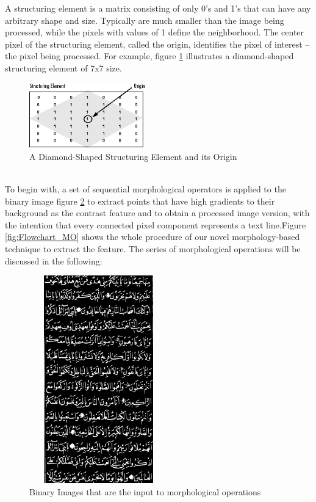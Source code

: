 \noindent
A structuring element is a matrix consisting of only 0's and 1's that can have any arbitrary shape and size. Typically are much smaller than the image being processed, while the pixels with values of 1 define the neighborhood. The center pixel of the structuring element, called the origin, identifies the pixel of interest – the pixel being processed.
\noindent
For example, figure \ref{fig:structuring-element} illustrates a diamond-shaped structuring element of 7x7 size.
\begin{figure}[!htb]
    \centering
    \includegraphics[width=5cm]{images/SE.png}
    \caption{A Diamond-Shaped Structuring Element and its Origin}
    \label{fig:structuring-element}
\end{figure} \\


To begin with, a set of sequential morphological operators is applied to the binary image figure \ref{fig:input_binary_img} to extract points that have high gradients to their background as the contrast feature and to obtain a processed image version, with the intention that every connected pixel component represents a text line.Figure \ref{fig:Flowchart_MO} shows the whole procedure of our novel morphology-based technique to extract the feature. The series of morphological operations will be discussed in the following:%
\begin{figure}[H]
    \centering
    \includegraphics[width=6cm, height=9cm]{images/input.png}
    \caption{Binary Images that are the input to morphological operations}
    \label{fig:input_binary_img}
\end{figure}

